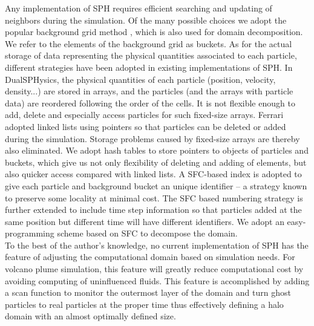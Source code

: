 Any implementation of SPH requires efficient searching and updating of neighbors during the simulation. Of the many possible choices we adopt the popular background grid method \cite{monaghan1985refined}, which is also used for domain decomposition. We refer to the elements of the background grid as buckets. 
As for the actual storage of data representing the physical quantities associated to each particle, different strategies have been adopted in existing implementations of SPH. 
In DualSPHysics\cite{crespo2015dualsphysics}, the physical quantities of each particle (position, velocity, density...) are stored in arrays, and the particles (and the arrays with particle data) are reordered following the order of the cells. It is not flexible enough to add, delete and especially access particles for such fixed-size arrays. Ferrari\cite{ferrari2009new} adopted linked lists using pointers so that particles can be deleted or added during the simulation. Storage problems caused by fixed-size arrays are thereby also eliminated. We adopt hash tables to store pointers to objects of particles and buckets, which give us not only flexibility of deleting and adding of elements, but also quicker access compared with linked lists. A SFC-based index is adopted to give each particle and background bucket an unique identifier -- a strategy known to preserve some locality at minimal cost. The SFC based numbering strategy is further extended to include time step information so that particles added at the same position but different time will have different identifiers. 
We adopt an easy-programming scheme based on SFC \cite{patra1999efficient} to decompose the domain.\\
To the best of the author's knowledge, no current implementation of SPH has the feature of adjusting the computational domain based on simulation needs. For volcano plume simulation, this feature will greatly reduce computational cost by avoiding computing of uninfluenced fluids. This feature is accomplished by adding a scan function to monitor the outermost layer of the domain and turn ghost particles to real particles at the proper time thus effectively defining a halo domain with an almost optimally defined size.\\
